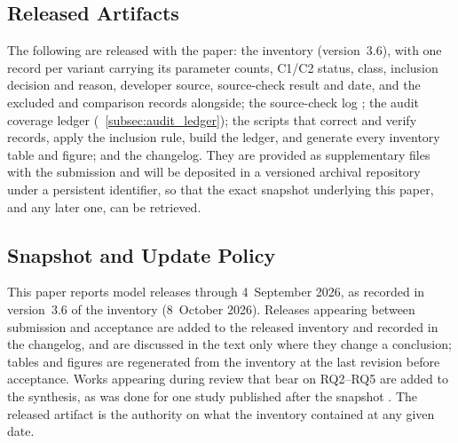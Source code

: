 \subsection{Released Artifacts}
\label{subsec:intro_artifacts}

The following are released with the paper: the inventory  (version~3.6), with one record per variant carrying its parameter counts, C1/C2 status, class, inclusion decision and reason, developer source, source-check result and date, and the excluded and comparison records alongside; the source-check log ; the audit coverage ledger  (\suppsec~\ref{subsec:audit_ledger}); the scripts that correct and verify records, apply the inclusion rule, build the ledger, and generate every inventory table and figure; and the changelog. They are provided as supplementary files with the submission and will be deposited in a versioned archival repository under a persistent identifier, so that the exact snapshot underlying this paper, and any later one, can be retrieved.

\subsection{Snapshot and Update Policy}
\label{subsubsec:intro_snapshot}

This paper reports model releases through 4~September 2026, as recorded in version~3.6 of the inventory (8~October 2026). Releases appearing between submission and acceptance are added to the released inventory and recorded in the changelog, and are discussed in the text only where they change a conclusion; tables and figures are regenerated from the inventory at the last revision before acceptance. Works appearing during review that bear on RQ2--RQ5 are added to the synthesis, as was done for one study published after the snapshot \citep{laskar2026sftrl}. The released artifact is the authority on what the inventory contained at any given date.
